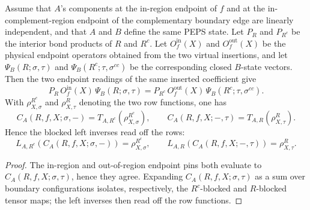 \begin{theorem}
    \label{thm:peps_region_resonate_identity_readoffs}
    \leanok
    Assume that \(A\)'s components at the in-region endpoint of \(f\) and at the
    in-complement-region endpoint of the complementary boundary edge are linearly
    independent, and that \(A\) and \(B\) define the same PEPS state.  Let
    \(P_R\) and \(P_{R^c}\) be the interior bond products of \(R\) and \(R^c\).
    Let \(O^{\mathrm{in}}_f(X)\) and \(O^{\mathrm{out}}_f(X)\) be the physical
    endpoint operators obtained from the two virtual insertions, and let
    \(\Psi_B(R;\sigma,\tau)\) and \(\Psi_B(R^c;\tau,\sigma^{cc})\) be the
    corresponding closed \(B\)-state vectors.  Then the two endpoint readings of
    the same inserted coefficient give
    \[
        P_R\,O^{\mathrm{in}}_f(X)\,\Psi_B(R;\sigma,\tau)
        =
        P_{R^c}\,O^{\mathrm{out}}_f(X)\,\Psi_B(R^c;\tau,\sigma^{cc}).
    \]
    With \(\rho^{R^c}_{X,\sigma}\) and \(\rho^{R}_{X,\tau}\) denoting the two
    row functions, one has
    \[
        C_A(R,f,X;\sigma,-)
        =
        T_{A,R^c}\!\left(\rho^{R^c}_{X,\sigma}\right),
        \qquad
        C_A(R,f,X;-,\tau)
        =
        T_{A,R}\!\left(\rho^{R}_{X,\tau}\right).
    \]
    Hence the blocked left inverses read off the rows:
    \[
        L_{A,R^c}\!\left(C_A(R,f,X;\sigma,-)\right)
        =
        \rho^{R^c}_{X,\sigma},
        \qquad
        L_{A,R}\!\left(C_A(R,f,X;-,\tau)\right)
        =
        \rho^{R}_{X,\tau}.
    \]
\end{theorem}
\begin{proof}\leanok
    The in-region and out-of-region endpoint pins both evaluate to
    \(C_A(R,f,X;\sigma,\tau)\), hence they agree.  Expanding
    \(C_A(R,f,X;\sigma,\tau)\) as a sum over boundary configurations isolates,
    respectively, the \(R^c\)-blocked and \(R\)-blocked tensor maps; the left
    inverses then read off the row functions.
\end{proof}

